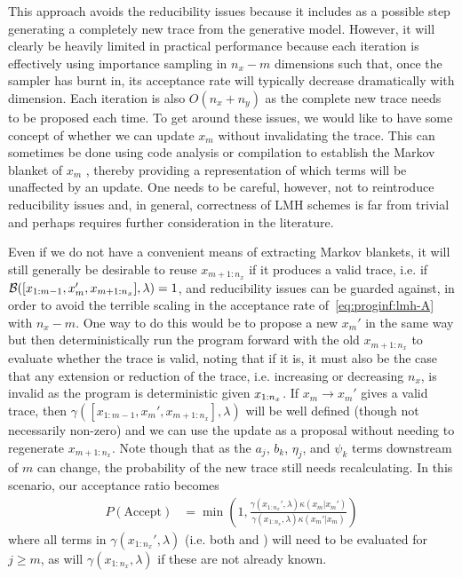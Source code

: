 This approach avoids the reducibility issues because it
includes as a possible step generating a completely new trace from the generative model.  However,
it will clearly be heavily limited in practical performance because each iteration
is effectively using importance sampling in $n_x-m$ dimensions such that, once the sampler has burnt in,
its acceptance rate will typically decrease dramatically with dimension.  Each iteration is also $O(n_x+n_y)$ as
the complete new trace needs to be proposed each time.  To get around these issues, we would like
to have some concept of whether we can update $x_m$ without invalidating the trace.  This can sometimes
be done using code analysis or compilation to establish the Markov blanket of $x_m$
\citep{yang2014generating,mansinghka2014venture,ritchie2016c3}, thereby providing a representation of which
terms will be unaffected by an update.  One needs to be
careful, however, not to reintroduce reducibility issues and, in general, correctness of LMH schemes is
far from trivial and perhaps requires further consideration in the literature.

Even if we do not have a convenient means of extracting Markov blankets, it will still generally be desirable
to reuse $x_{m+1:n_x}$ if it produces a valid trace, i.e. if $\mathcal{B} ([x_{1:m-1},x_m',x_{m+1:n_x}],\lambda)=1$, and reducibility
issues can be guarded against, in order to avoid the terrible scaling in the acceptance rate 
of~\eqref{eq:proginf:lmh-A}  with $n_x-m$.  One way to do this would be to propose
a new $x_m'$ in the same way but then deterministically run the program forward with the old
$x_{m+1:n_x}$ to evaluate whether the trace is valid, noting that if it is, it must also be the case that any 
extension or reduction of the trace, i.e. increasing or decreasing
$n_x$, is invalid as the program is deterministic given $x_{1:n_x}$.  If $x_m \rightarrow x_m'$ gives
a valid trace, then $\gamma([x_{1:m-1},x_m',x_{m+1:n_x}],\lambda)$ will be well defined (though not necessarily
non-zero) and we can use the update as a proposal without needing to regenerate $x_{m+1:n_x}$.  Note though
that as the $a_j$, $b_k$, $\eta_j$, and $\psi_k$ terms downstream of $m$ can change, the 
probability of the new trace still needs recalculating.  In this scenario, our acceptance ratio becomes
\begin{align}
  P(\text{Accept}) &= \min\left(1, \frac{\gamma(x_{1:n_x}',\lambda) \kappa(x_m | x_{m}')  }
  {\gamma(x_{1:n_x},\lambda) \kappa(x_m' | x_{m})  }\right)
\end{align}
where all terms in $\gamma(x_{1:n_x}',\lambda)$ (i.e. both \sample and \observe) will need
to be evaluated for $j\ge m$, as will $\gamma(x_{1:n_x},\lambda)$ if these are not already known. 

